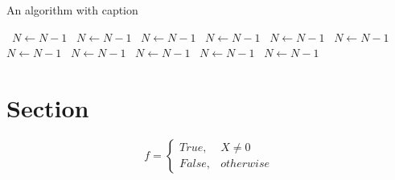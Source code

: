 \documentclass[a4paper]{article}
\begin{document}
\begin{algorithm}
\caption{An algorithm with caption}
\begin{algorithmic}
\    \State $N \gets N - 1$
\    \State $N \gets N - 1$
\    \State $N \gets N - 1$
\    \State $N \gets N - 1$
\    \State $N \gets N - 1$
\    \State $N \gets N - 1$
\    \State $N \gets N - 1$
\    \State $N \gets N - 1$
\    \State $N \gets N - 1$
\    \State $N \gets N - 1$
\    \State $N \gets N - 1$
\EndWhile
\end{algorithmic}
\end{algorithm}

\section{Section}

\begin{equation}   f =
\begin{cases} True, & X \neq 0\\
False, & otherwise
\end{cases}
\end{equation}
\end{document}
